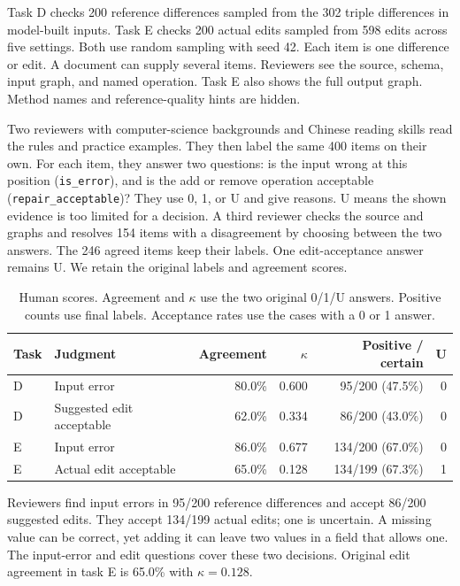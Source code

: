 Task D checks 200 reference differences sampled from the 302 triple
differences in model-built inputs. Task E checks 200 actual edits sampled
from 598 edits across five settings. Both use random sampling with seed 42.
Each item is one difference or edit. A document can supply several items.
Reviewers see the source, schema, input graph, and named operation.
Task E also shows the full output graph. Method names and reference-quality
hints are hidden.

Two reviewers with computer-science backgrounds and Chinese reading skills
read the rules and practice examples. They then label the same 400 items
on their own. For each item, they answer two questions: is the input wrong
at this position (\texttt{is\_error}), and is the add or remove operation
acceptable (\texttt{repair\_acceptable})? They use 0, 1, or U and give reasons.
U means the shown evidence is too limited for a decision.
A third reviewer checks the source and graphs and resolves 154 items with
a disagreement by choosing between the two answers. The 246 agreed items
keep their labels. One edit-acceptance answer remains U.
We retain the original labels and agreement scores.

\begin{table}[t]
\centering
\caption{Human scores. Agreement and $\kappa$ use the two original 0/1/U answers. Positive counts use final labels. Acceptance rates use the cases with a 0 or 1 answer.}
\label{tab:human_review}
\small
\begin{tabular}{llrrrr}
\toprule
Task & Judgment & Agreement & $\kappa$ & Positive / certain & U \\
\midrule
D & Input error & 80.0\% & 0.600 & 95/200 (47.5\%) & 0 \\
D & Suggested edit acceptable & 62.0\% & 0.334 & 86/200 (43.0\%) & 0 \\
E & Input error & 86.0\% & 0.677 & 134/200 (67.0\%) & 0 \\
E & Actual edit acceptable & 65.0\% & 0.128 & 134/199 (67.3\%) & 1 \\
\bottomrule
\end{tabular}
\end{table}

Reviewers find input errors in 95/200 reference differences and accept
86/200 suggested edits. They accept 134/199 actual edits; one is uncertain.
A missing value can be correct, yet adding it can leave two values in a
field that allows one. The input-error and edit questions cover these
two decisions. Original edit agreement in task E is 65.0\% with
$\kappa=0.128$.

